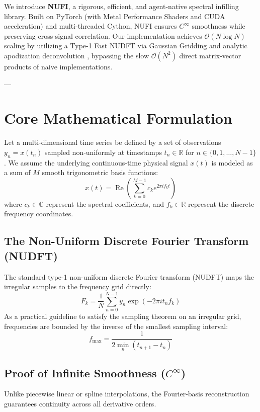 \documentclass[11pt,a4paper]{article}
\begin{document}
We introduce \textbf{NUFI}, a rigorous, efficient, and agent-native spectral infilling library. Built on PyTorch (with Metal Performance Shaders and CUDA acceleration) and multi-threaded Cython, NUFI ensures $C^\infty$ smoothness while preserving cross-signal correlation. Our implementation achieves $\mathcal{O}(N \log N)$ scaling by utilizing a Type-1 Fast NUDFT via Gaussian Gridding and analytic apodization deconvolution \cite{Greengard2004, Barnett2019}, bypassing the slow $\mathcal{O}(N^2)$ direct matrix-vector products of naive implementations.

---

\section{Core Mathematical Formulation}

Let a multi-dimensional time series be defined by a set of observations $y_n = x(t_n)$ sampled non-uniformly at timestamps $t_n \in \mathbb{R}$ for $n \in \{0, 1, \dots, N-1\}$. We assume the underlying continuous-time physical signal $x(t)$ is modeled as a sum of $M$ smooth trigonometric basis functions:
\begin{equation}
x(t) = \operatorname{Re}\left( \sum_{k=0}^{M-1} c_k e^{2\pi i f_k t} \right)
\end{equation}
where $c_k \in \mathbb{C}$ represent the spectral coefficients, and $f_k \in \mathbb{R}$ represent the discrete frequency coordinates.

\subsection{The Non-Uniform Discrete Fourier Transform (NUDFT)}
The standard type-1 non-uniform discrete Fourier transform (NUDFT) maps the irregular samples to the frequency grid directly:
\begin{equation}
F_k = \frac{1}{N} \sum_{n=0}^{N-1} y_n \exp\left(-2\pi i t_n f_k\right)
\end{equation}
As a practical guideline to satisfy the sampling theorem on an irregular grid, frequencies are bounded by the inverse of the smallest sampling interval:
\begin{equation}
f_{\max} = \frac{1}{2 \min_n(t_{n+1} - t_n)}
\end{equation}

\subsection{Proof of Infinite Smoothness ($C^\infty$)}
Unlike piecewise linear or spline interpolations, the Fourier-basis reconstruction guarantees continuity across all derivative orders.
\end{document}
